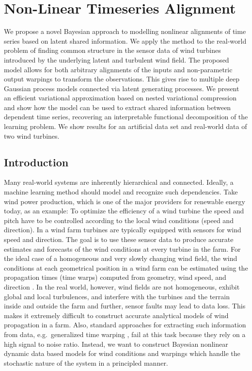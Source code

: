 \section{Non-Linear Timeseries Alignment}
\label{sec:timeseries_alignment}
We propose a novel Bayesian approach to modelling nonlinear alignments of time series based on latent shared information.
We apply the method to the real-world problem of finding common structure in the sensor data of wind turbines introduced by the underlying latent and turbulent wind field.
The proposed model allows for both arbitrary alignments of the inputs and non-parametric output warpings to transform the observations.
This gives rise to multiple deep Gaussian process models connected via latent generating processes.
We present an efficient variational approximation based on nested variational compression and show how the model can be used to extract shared information between dependent time series, recovering an interpretable functional decomposition of the learning problem.
We show results for an artificial data set and real-world data of two wind turbines.


\subsection{Introduction}
Many real-world systems are inherently hierarchical and connected.
Ideally, a machine learning method should model and recognize such dependencies.
Take wind power production, which is one of the major providers for renewable energy today, as an example:
To optimize the efficiency of a wind turbine the speed and pitch have to be controlled according to the local wind conditions (speed and direction).
In a wind farm turbines are typically equipped with sensors for wind speed and direction.
The goal is to use these sensor data to produce accurate estimates and forecasts of the wind conditions at every turbine in the farm.
For the ideal case of a homogeneous and very slowly changing wind field, the wind conditions at each geometrical position in a wind farm can be estimated using the propagation times (time warps) computed from geometry, wind speed, and direction \parencite{soleimanzadeh_controller_2011,bitar_coordinated_2013,schepers_improved_2007}.
In the real world, however, wind fields are not homogeneous, exhibit global and local turbulences, and interfere with the turbines and the terrain inside and outside the farm and further, sensor faults may lead to data loss.
This makes it extremely difficult to construct accurate analytical models of wind propagation in a farm.
Also, standard approaches for extracting such information from data, e.g.\ generalized time warping  \parencite{zhou_generalized_2012}, fail at this task because they rely on a high signal to noise ratio.
Instead, we want to construct Bayesian nonlinear dynamic data based models for wind conditions and warpings which handle the stochastic nature of the system in a principled manner.

